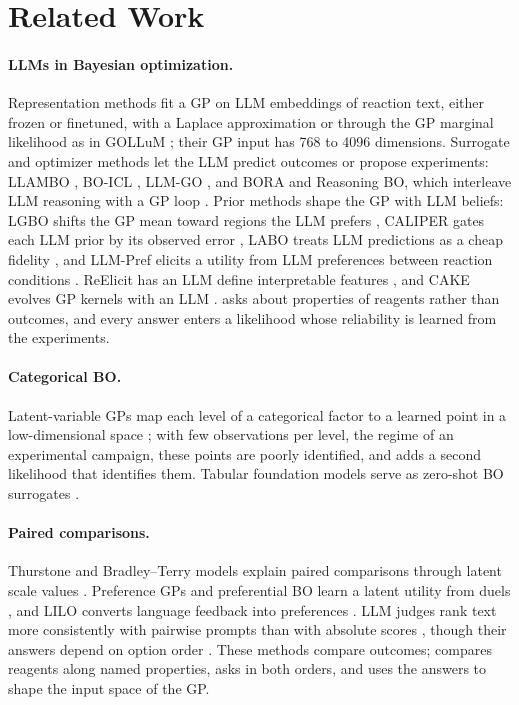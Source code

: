 \section{Related Work}
\label{sec:related}

\paragraph{LLMs in Bayesian optimization.}
Representation methods fit a GP on LLM embeddings of reaction text, either frozen \citep{rankovic2023bochemian} or finetuned, with a Laplace approximation \citep{kristiadi2024sober} or through the GP marginal likelihood as in GOLLuM \citep{rankovic2026gollum,sin2026dynamic}; their GP input has 768 to 4096 dimensions. Surrogate and optimizer methods let the LLM predict outcomes or propose experiments: LLAMBO \citep{liu2024llambo}, BO-ICL \citep{ramos2026boicl}, LLM-GO \citep{macknight2025pretrained}, and BORA and Reasoning BO, which interleave LLM reasoning with a GP loop \citep{cisse2025bora,yang2026reasoningbo}. Prior methods shape the GP with LLM beliefs: LGBO shifts the GP mean toward regions the LLM prefers \citep{yuan2026lgbo}, CALIPER gates each LLM prior by its observed error \citep{chen2026caliper}, LABO treats LLM predictions as a cheap fidelity \citep{chen2026labo}, and LLM-Pref elicits a utility from LLM preferences between reaction conditions \citep{patel2026distilling}. ReElicit has an LLM define interpretable features \citep{lin2026embedding}, and CAKE evolves GP kernels with an LLM \citep{suwandi2025cake}. \ours{} asks about properties of reagents rather than outcomes, and every answer enters a likelihood whose reliability is learned from the experiments.

\paragraph{Categorical BO.}
Latent-variable GPs map each level of a categorical factor to a learned point in a low-dimensional space \citep{zhang2020latent,oune2021latent}; with few observations per level, the regime of an experimental campaign, these points are poorly identified, and \ours{} adds a second likelihood that identifies them. Tabular foundation models serve as zero-shot BO surrogates \citep{hollmann2025tabpfn,rogers2026zeroshot}.

\paragraph{Paired comparisons.}
Thurstone and Bradley--Terry models explain paired comparisons through latent scale values \citep{thurstone1927law,bradley1952rank}. Preference GPs and preferential BO learn a latent utility from duels \citep{chu2005preference,gonzalez2017preferential}, and LILO converts language feedback into preferences \citep{kobalczyk2026lilo}. LLM judges rank text more consistently with pairwise prompts than with absolute scores \citep{liusie2024comparative,qin2024prp,zheng2023judging}, though their answers depend on option order \citep{wang2024fair}. These methods compare outcomes; \ours{} compares reagents along named properties, asks in both orders, and uses the answers to shape the input space of the GP.
